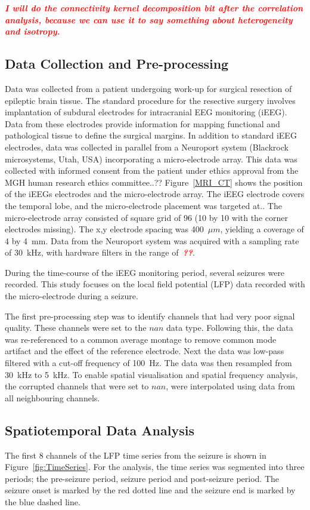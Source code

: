 \documentclass[]{article}
\newcommand{\dean}[1]{\textsf{\emph{\textbf{\textcolor{red}{#1}}}}}
\begin{document}
\dean{I will do the connectivity kernel decomposition bit after the correlation analysis, because we can use it to say something about heterogeneity and isotropy.}

\subsection{Data Collection and Pre-processing}

Data was collected from a patient undergoing work-up for surgical resection of epileptic brain tissue. The standard procedure for the resective surgery involves implantation of subdural electrodes for intracranial EEG monitoring (iEEG). Data from these electrodes provide information for mapping functional and pathological tissue to define the surgical margins. In addition to standard iEEG electrodes, data was collected in parallel from a Neuroport system (Blackrock microsystems, Utah, USA) incorporating a micro-electrode array. This data was collected with informed consent from the patient under ethics approval from the MGH human research ethics committee..?? Figure~\ref{MRI_CT} shows the position of the iEEGs electrodes and the micro-electrode array. The iEEG electrode covers the temporal lobe, and the micro-electrode placement was targeted at.. The micro-electrode array consisted of square grid of 96 (10 by 10 with the corner electrodes missing). The x,y electrode spacing was 400~$\mu m$, yielding a coverage of 4 by 4~mm. Data from the Neuroport system was acquired with a sampling rate of 30~kHz, with hardware filters in the range of~\dean{??}. 

During the time-course of the iEEG monitoring period, several seizures were recorded. This study focuses on the local field potential (LFP) data recorded with the micro-electrode during a seizure. 

The first pre-processing step was to identify channels that had very poor signal quality. These channels were set to the $nan$ data type. Following this, the data was re-referenced to a common average montage to remove common mode artifact and the effect of the reference electrode. Next the data was low-pass filtered with a cut-off frequency of 100~Hz. The data was then resampled from 30~kHz to 5~kHz. To enable spatial visualisation and spatial frequency analysis, the corrupted channels that were set to $nan$, were interpolated using data from all neighbouring channels.

\subsection{Spatiotemporal Data Analysis}
The first 8 channels of the LFP time series from the seizure is shown in Figure~\ref{fig:TimeSeries}. For the analysis, the time series was segmented into three periods; the pre-seizure period, seizure period and post-seizure period. The seizure onset is marked by the red dotted line and the seizure end is marked by the blue dashed line. 
\end{document}
